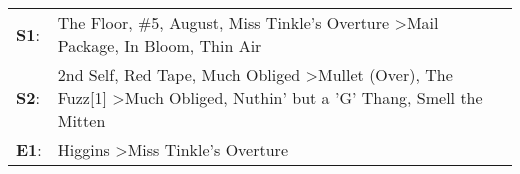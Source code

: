 \begin{supertabular}{p{0.03\textwidth}p{0.92\textwidth}}
 \textbf{S1}:  &                                                                              The Floor\textsuperscript{}, \enspace \#5\textsuperscript{}, \enspace August\textsuperscript{}, \enspace Miss Tinkle's Overture\textsuperscript{} \textgreater \enspace Mail Package\textsuperscript{}, \enspace In Bloom\textsuperscript{}, \enspace Thin Air\textsuperscript{}  \enspace  \\
 \textbf{S2}:  &  2nd Self\textsuperscript{}, \enspace Red Tape\textsuperscript{}, \enspace Much Obliged\textsuperscript{} \textgreater \enspace Mullet (Over)\textsuperscript{}, \enspace The Fuzz[1]\textsuperscript{} \textgreater \enspace Much Obliged\textsuperscript{}, \enspace Nuthin' but a 'G' Thang\textsuperscript{}, \enspace Smell the Mitten\textsuperscript{}  \enspace  \\
 \textbf{E1}:  &                                                                                                                                                                                                                                                                      Higgins\textsuperscript{} \textgreater \enspace Miss Tinkle's Overture\textsuperscript{}  \enspace  \\
\end{supertabular}
